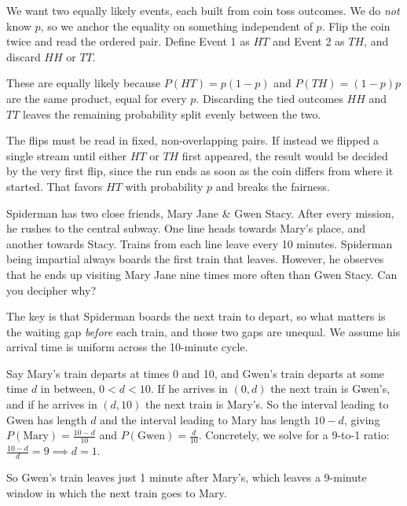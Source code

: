 \begin{solution}
We want two equally likely events, each built from coin toss outcomes. We do \textit{not} know $p$, so we anchor the equality on something independent of $p$. Flip the coin twice and read the ordered pair. Define Event 1 as $HT$ and Event 2 as $TH$, and discard $HH$ or $TT$.

These are equally likely because $P(HT) = p(1-p)$ and $P(TH) = (1-p)p$ are the same product, equal for every $p$. Discarding the tied outcomes $HH$ and $TT$ leaves the remaining probability split evenly between the two.

The flips must be read in fixed, non-overlapping pairs. If instead we flipped a single stream until either $HT$ or $TH$ first appeared, the result would be decided by the very first flip, since the run ends as soon as the coin differs from where it started. That favors $HT$ with probability $p$ and breaks the fairness.
\end{solution}

\newpage

\begin{problem}
Spiderman has two close friends, Mary Jane \& Gwen Stacy. After every mission, he rushes to the central subway. One line heads towards Mary's place, and another towards Stacy. Trains from each line leave every 10 minutes. Spiderman being impartial always boards the first train that leaves. However, he observes that he ends up visiting Mary Jane nine times more often than Gwen Stacy. Can you decipher why?
\end{problem}

\begin{solution}
The key is that Spiderman boards the next train to depart, so what matters is the waiting gap \textit{before} each train, and those two gaps are unequal. We assume his arrival time is uniform across the 10-minute cycle.

Say Mary's train departs at times 0 and 10, and Gwen's train departs at some time $d$ in between, $0 < d < 10$. If he arrives in $(0, d)$ the next train is Gwen's, and if he arrives in $(d, 10)$ the next train is Mary's. So the interval leading to Gwen has length $d$ and the interval leading to Mary has length $10 - d$, giving $P(\text{Mary}) = \frac{10 - d}{10}$ and $P(\text{Gwen}) = \frac{d}{10}$. Concretely, we solve for a 9-to-1 ratio: $\frac{10 - d}{d} = 9 \implies d = 1$.

So Gwen's train leaves just 1 minute after Mary's, which leaves a 9-minute window in which the next train goes to Mary.
\end{solution}

